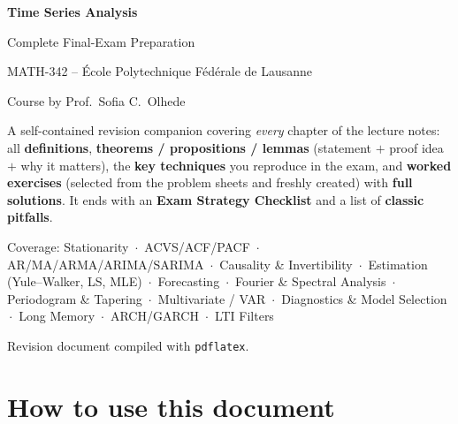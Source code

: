 \documentclass[11pt]{article}
\begin{document}
\begin{titlepage}
\centering
\vspace*{2.2cm}
{\Huge\bfseries Time Series Analysis\par}
\vspace{0.6cm}
{\LARGE Complete Final-Exam Preparation\par}
\vspace{0.4cm}
{\large MATH-342 -- \'Ecole Polytechnique F\'ed\'erale de Lausanne\par}
{\large Course by Prof.\ Sofia C.\ Olhede\par}
\vspace{1.6cm}

\begin{tcolorbox}[width=0.86\textwidth, colback=blue!4!white,
  colframe=blue!58!black, arc=2mm, boxrule=0.8pt,
  title=\textbf{What this document is}, coltitle=white,
  colbacktitle=blue!58!black, fonttitle=\large\bfseries]
A self-contained revision companion covering \emph{every} chapter of the
lecture notes: all \textbf{definitions}, \textbf{theorems / propositions /
lemmas} (statement $+$ proof idea $+$ why it matters), the \textbf{key
techniques} you reproduce in the exam, and \textbf{worked exercises}
(selected from the problem sheets and freshly created) with \textbf{full
solutions}. It ends with an \textbf{Exam Strategy Checklist} and a list of
\textbf{classic pitfalls}.
\end{tcolorbox}

\vfill
{\large Coverage: Stationarity \,$\cdot$\, ACVS/ACF/PACF \,$\cdot$\,
AR/MA/ARMA/ARIMA/SARIMA \,$\cdot$\, Causality \& Invertibility \,$\cdot$\,
Estimation (Yule--Walker, LS, MLE) \,$\cdot$\, Forecasting \,$\cdot$\,
Fourier \& Spectral Analysis \,$\cdot$\, Periodogram \& Tapering \,$\cdot$\,
Multivariate / VAR \,$\cdot$\, Diagnostics \& Model Selection \,$\cdot$\,
Long Memory \,$\cdot$\, ARCH/GARCH \,$\cdot$\, LTI Filters\par}
\vspace{1.2cm}
{\large Revision document compiled with \texttt{pdflatex}.\par}
\end{titlepage}

\section*{How to use this document}
\end{document}
